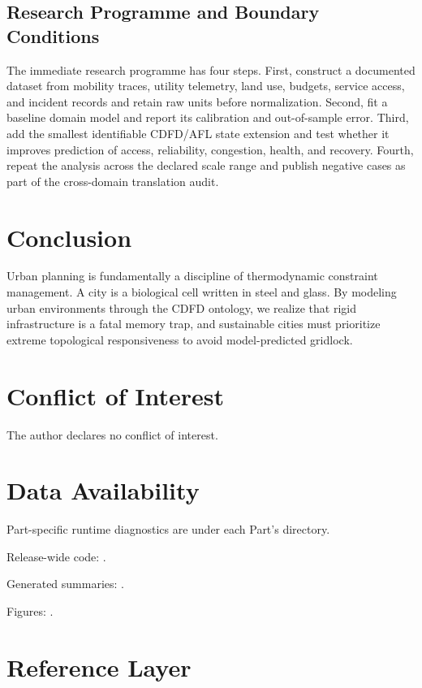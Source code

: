 \documentclass[11pt,a4paper]{article}
\begin{document}
\subsection{Research Programme and Boundary Conditions}

The immediate research programme has four steps. First, construct a documented
dataset from mobility traces, utility telemetry, land use, budgets, service access, and incident records and retain raw units before normalization.
Second, fit a baseline domain model and report its calibration and out-of-sample
error. Third, add the smallest identifiable CDFD/AFL state extension and test
whether it improves prediction of access, reliability, congestion, health, and recovery. Fourth, repeat the
analysis across the declared scale range and publish negative cases as part of
the cross-domain translation audit.


\section{Conclusion}
Urban planning is fundamentally a discipline of thermodynamic constraint management. A city is a biological cell written in steel and glass. By modeling urban environments through the CDFD ontology, we realize that rigid infrastructure is a fatal memory trap, and sustainable cities must prioritize extreme topological responsiveness to avoid model-predicted gridlock.
\section*{Conflict of Interest} The author declares no conflict of interest.
\section*{Data Availability}
Part-specific runtime diagnostics are under each Part's  directory.

Release-wide code: .

Generated summaries: .

Figures: .


\section{Reference Layer}


\end{document}
